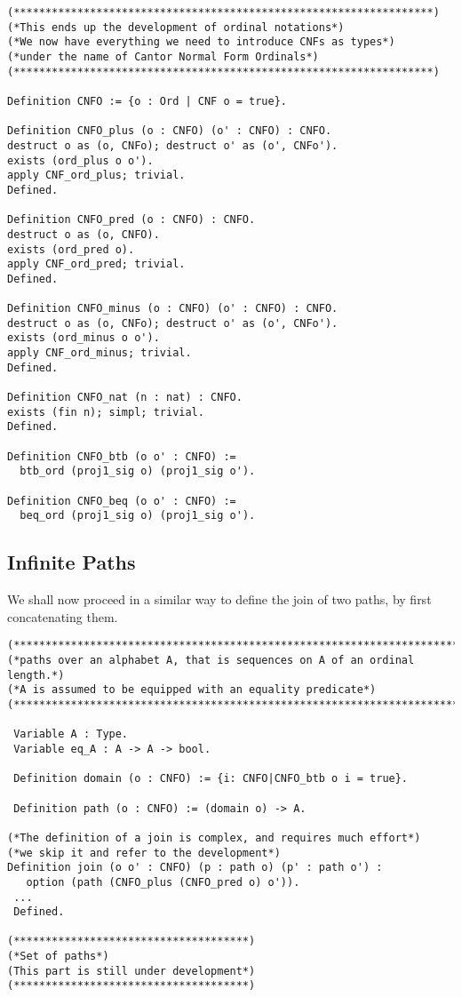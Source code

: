 \documentclass{llncs}
\begin{document}
\begin{verbatim}
(******************************************************************)
(*This ends up the development of ordinal notations*)
(*We now have everything we need to introduce CNFs as types*)
(*under the name of Cantor Normal Form Ordinals*)
(******************************************************************)

Definition CNFO := {o : Ord | CNF o = true}.

Definition CNFO_plus (o : CNFO) (o' : CNFO) : CNFO.
destruct o as (o, CNFo); destruct o' as (o', CNFo').
exists (ord_plus o o').
apply CNF_ord_plus; trivial.
Defined.

Definition CNFO_pred (o : CNFO) : CNFO.
destruct o as (o, CNFO).
exists (ord_pred o).
apply CNF_ord_pred; trivial.
Defined.

Definition CNFO_minus (o : CNFO) (o' : CNFO) : CNFO.
destruct o as (o, CNFo); destruct o' as (o', CNFo').
exists (ord_minus o o').
apply CNF_ord_minus; trivial.
Defined.

Definition CNFO_nat (n : nat) : CNFO.
exists (fin n); simpl; trivial.
Defined.

Definition CNFO_btb (o o' : CNFO) := 
  btb_ord (proj1_sig o) (proj1_sig o').

Definition CNFO_beq (o o' : CNFO) := 
  beq_ord (proj1_sig o) (proj1_sig o').
\end{verbatim}



\subsection{Infinite Paths}

We shall now proceed in a similar way to define the join of two paths,
by first concatenating them.

\begin{verbatim}
(************************************************************************)
(*paths over an alphabet A, that is sequences on A of an ordinal length.*)
(*A is assumed to be equipped with an equality predicate*)
(************************************************************************)

 Variable A : Type.
 Variable eq_A : A -> A -> bool.

 Definition domain (o : CNFO) := {i: CNFO|CNFO_btb o i = true}.

 Definition path (o : CNFO) := (domain o) -> A.

(*The definition of a join is complex, and requires much effort*)
(*we skip it and refer to the development*)
Definition join (o o' : CNFO) (p : path o) (p' : path o') : 
   option (path (CNFO_plus (CNFO_pred o) o')).
 ...
 Defined.

(*************************************)
(*Set of paths*)
(This part is still under development*)
(*************************************)
\end{verbatim}
\end{document}
